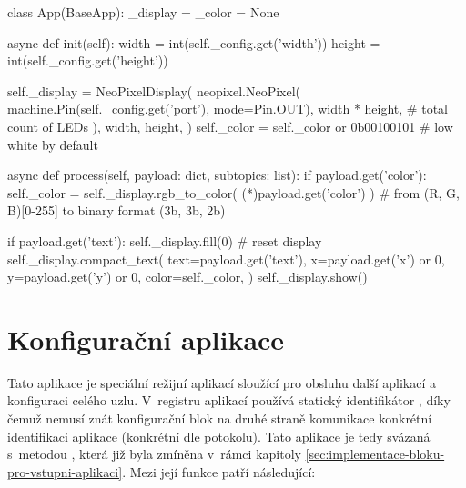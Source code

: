 \begin{code}[
    language=Python,
    caption={Ukázka z~implementace výstupní aplikace -- v~korutině \ic{init} aplikace připraví ovladač na základě
    parametrů doručených z~editoru. Korutina \ic{process} zodpovědná za zpracování příchozí zprávy následně tento
    ovladač řídí -- dle nastavené barvy a textu odešle požadavek na displej.},
    label=code:np-display-app
]
class App(BaseApp):
    _display = _color = None

    async def init(self):
        width = int(self._config.get('width'))
        height = int(self._config.get('height'))

        self._display = NeoPixelDisplay(
            neopixel.NeoPixel(
                machine.Pin(self._config.get('port'), mode=Pin.OUT),
                width * height,  # total count of LEDs
            ),
            width, height,
        )
        self._color = self._color or 0b00100101  # low white by default

    async def process(self, payload: dict, subtopics: list):
        if payload.get('color'):
            self._color = self._display.rgb_to_color(
                (*\textasteriskcentered*)payload.get('color')
            )  # from (R, G, B)[0-255] to binary format (3b, 3b, 2b)

        if payload.get('text'):
            self._display.fill(0)  # reset display
            self._display.compact_text(
                text=payload.get('text'),
                x=payload.get('x') or 0,
                y=payload.get('y') or 0,
                color=self._color,
            )
            self._display.show()
\end{code}


\section{Konfigurační aplikace}\label{sec:konfiguracni-aplikace}

Tato aplikace je speciální režijní aplikací sloužící pro obsluhu další aplikací a
konfiguraci celého uzlu. V~registru aplikací používá statický identifikátor ,
díky čemuž nemusí znát konfigurační blok  na druhé straně komunikace konkrétní
identifikaci aplikace (konkrétní  dle potokolu). Tato aplikace je tedy svázaná
s~metodou , která již byla zmíněna v~rámci kapitoly
\ref{sec:implementace-bloku-pro-vstupni-aplikaci}. Mezi její funkce patří následující:

